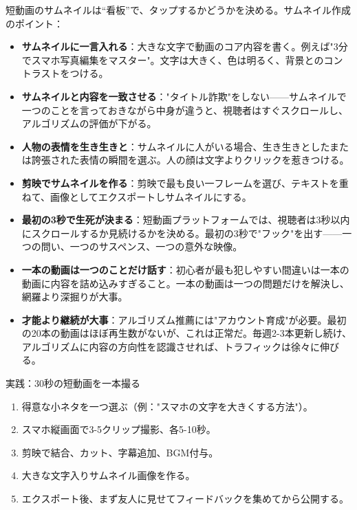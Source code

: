 
短動画のサムネイルは“看板”で、タップするかどうかを決める。サムネイル作成のポイント：

\begin{itemize}
  \item \textbf{サムネイルに一言入れる}：大きな文字で動画のコア内容を書く。例えば"3分でスマホ写真編集をマスター"。文字は大きく、色は明るく、背景とのコントラストをつける。
  \item \textbf{サムネイルと内容を一致させる}："タイトル詐欺"をしない——サムネイルで一つのことを言っておきながら中身が違うと、視聴者はすぐスクロールし、アルゴリズムの評価が下がる。
  \item \textbf{人物の表情を生き生きと}：サムネイルに人がいる場合、生き生きとしたまたは誇張された表情の瞬間を選ぶ。人の顔は文字よりクリックを惹きつける。
  \item \textbf{剪映でサムネイルを作る}：剪映で最も良い一フレームを選び、テキストを重ねて、画像としてエクスポートしサムネイルにする。
\end{itemize}


\begin{itemize}
  \item \textbf{最初の3秒で生死が決まる}：短動画プラットフォームでは、視聴者は3秒以内にスクロールするか見続けるかを決める。最初の3秒で"フック"を出す——一つの問い、一つのサスペンス、一つの意外な映像。
  \item \textbf{一本の動画は一つのことだけ話す}：初心者が最も犯しやすい間違いは一本の動画に内容を詰め込みすぎること。一本の動画は一つの問題だけを解決し、網羅より深掘りが大事。
  \item \textbf{才能より継続が大事}：アルゴリズム推薦には"アカウント育成"が必要。最初の20本の動画はほぼ再生数がないが、これは正常だ。毎週2-3本更新し続け、アルゴリズムに内容の方向性を認識させれば、トラフィックは徐々に伸びる。
\end{itemize}

\begin{tcbpractice}{実践：30秒の短動画を一本撮る}
\begin{enumerate}
  \item 得意な小ネタを一つ選ぶ（例："スマホの文字を大きくする方法"）。
  \item スマホ縦画面で3-5クリップ撮影、各5-10秒。
  \item 剪映で結合、カット、字幕追加、BGM付与。
  \item 大きな文字入りサムネイル画像を作る。
  \item エクスポート後、まず友人に見せてフィードバックを集めてから公開する。
\end{enumerate}

\end{tcbpractice}

